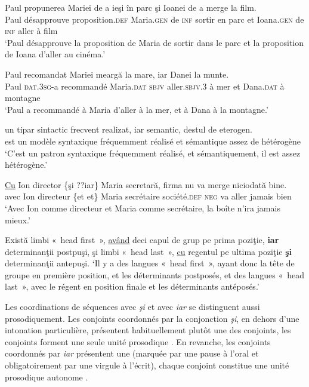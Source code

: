 \ex 
\gll *Paul    propunerea  Mariei  de  a  ieşi  în  parc  şi  Ioanei de  a  merge  la  film.\\
Paul  désapprouve  proposition.\textsc{def}  Maria.\textsc{gen}  de  \textsc{inf}  sortir  en  parc  et  Ioana.\textsc{gen} de  \textsc{inf}  aller  à  film\\
\glt ‘Paul désapprouve la proposition de Maria de sortir dans le parc et la proposition de Ioana d’aller au cinéma.’
\z
\z


\ea \label{ch2:ex311}
\ea 
\gll Paul    recomandat  Mariei    meargă  la  mare,  iar  Danei la  munte. \label{ch2:ex311a}\\
Paul  \textsc{dat.3sg}{}-a  recommandé  Maria.\textsc{dat}  \textsc{sbjv}  aller.\textsc{sbjv.3} à  mer  et  Dana.\textsc{dat} à  montagne\\
\glt ‘Paul a recommandé à Maria d’aller à la mer, et à Dana à la montagne.’ 

\ex 
\gll {}  un  tipar  sintactic  frecvent  realizat,  iar  semantic,  destul  de eterogen. \label{ch2:ex311b}\\
est  un  modèle  syntaxique  fréquemment  réalisé  et  sémantique  assez  de hétérogène\\
\glt ‘C’est un patron syntaxique fréquemment réalisé, et sémantiquement, il est assez hétérogène.’ 
\z
\z


\ea \label{ch2:ex312}
\ea 
\gll \uline{Cu}  Ion  director  \{şi {\textbar} ??iar\}  Maria  secretară,  firma  nu  va  merge niciodată  bine. \label{ch2:ex312a}\\
avec  Ion  directeur  \{et {\textbar} et\}  Maria  secrétaire  société.\textsc{def} \textsc{neg}  va  aller jamais  bien\\
\glt ‘Avec Ion comme directeur et Maria comme secrétaire, la boîte n’ira jamais mieux.’

\ex Există limbi «~head first~», \uline{având} deci capul de grup pe prima poziţie, \textbf{iar} determinanţii postpuşi, şi limbi «~head last~», \uline{cu} regentul pe ultima poziţie \textbf{şi} determinanţii antepuşi. \label{ch2:ex312b}
\glt ‘Il y a des langues «~head first~», ayant donc la tête de groupe en première position, et les déterminants postposés, et des langues «~head last~», avec le régent en position finale et les déterminants antéposés.’ 
\z
\z

Les coordinations de séquences avec \textit{şi} et avec \textit{iar} se distinguent aussi prosodiquement. Les conjoints coordonnés par la conjonction \textit{şi}, en dehors d’une intonation particulière, présentent habituellement plutôt une  des conjoints, {\cad} les conjoints forment une seule unité prosodique . En revanche, les conjoints coordonnés par \textit{iar} présentent une  (marquée par une pause à l’oral et obligatoirement par une virgule à l’écrit), {{\cad}} chaque conjoint constitue une unité prosodique autonome . 

